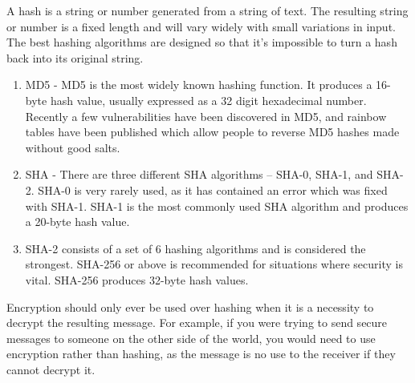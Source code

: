 \medskip
{}
    \begin{tcolorbox}
    [enhanced,
    title=Hashing,
    frame style=
    {left color=orange!85!black,right color=yellow!95!black}]

    A hash is a string or number generated from a string of text. The resulting string or number is a fixed length and will vary widely with small variations in input. The best hashing algorithms are designed so that it's impossible to turn a hash back into its original string.

\tcblower

\footnotesize \begin{enumerate}
                    \item MD5 - MD5 is the most widely known hashing function. It produces a 16-byte hash value, usually expressed as a 32 digit hexadecimal number. Recently a few vulnerabilities have been discovered in MD5, and rainbow tables have been published which allow people to reverse MD5 hashes made without good salts.
                    \item SHA - There are three different SHA algorithms -- SHA-0, SHA-1, and SHA-2. SHA-0 is very rarely used, as it has contained an error which was fixed with SHA-1. SHA-1 is the most commonly used SHA algorithm and produces a 20-byte hash value.
                    \item SHA-2 consists of a set of 6 hashing algorithms and is considered the strongest. SHA-256 or above is recommended for situations where security is vital. SHA-256 produces 32-byte hash values.
                \end{enumerate}
\end{tcolorbox}
\medskip
    
Encryption should only ever be used over hashing when it is a necessity to decrypt the resulting message. For example, if you were trying to send secure messages to someone on the other side of the world, you would need to use encryption rather than hashing, as the message is no use to the receiver if they cannot decrypt it.


